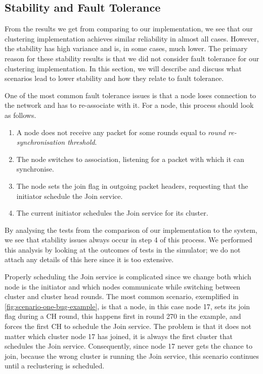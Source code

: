 \subsection{Stability and Fault Tolerance}
\label{subsec:discussion-stability-and-fault-tolerance}
\begin{newtext}
From the results we get from comparing \atwo{} to our implementation, we see that our clustering implementation achieves similar reliability in almost all cases. However, the stability has high variance and is, in some cases, much lower. The primary reason for these stability results is that we did not consider fault tolerance for our clustering implementation. In this section, we will describe and discuss what scenarios lead to lower stability and how they relate to fault tolerance.



One of the most common fault tolerance issues is that a node loses connection to the network and has to re-associate with it. For a node, this process should look as follows.
    
\begin{enumerate}
    \item A node does not receive any packet for some rounds equal to \emph{round re-synchronisation threshold}.
    \item The node switches to association, listening for a packet with which it can synchronise.
    \item The node sets the join flag in outgoing packet headers, requesting that the initiator schedule the Join service.
    \item The current initiator schedules the Join service for its cluster.
\end{enumerate}

By analysing the tests from the comparison of our implementation to the \atwo{} system, we see that stability issues always occur in step 4 of this process. We performed this analysis by looking at the outcomes of tests in the simulator; we do not attach any details of this here since it is too extensive.

Properly scheduling the Join service is complicated since we change both which node is the initiator and which nodes communicate while switching between cluster and cluster head rounds. The most common scenario, exemplified in \cref{fig:scenario-one-bug-example}, is that a node, in this case node 17, sets its join flag during a CH round, this happens first in round 270 in the example, and forces the first CH to schedule the Join service. The problem is that it does not matter which cluster node 17 has joined, it is always the first cluster that schedules the Join service. Consequently, since node 17 never gets the chance to join, because the wrong cluster is running the Join service, this scenario continues until a reclustering is scheduled.

\end{newtext}
